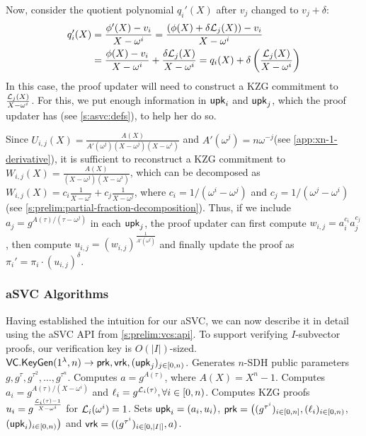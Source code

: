Now, consider the quotient polynomial $q_i'(X)$ after $v_j$ changed to $v_j+\delta$:
{\ifCameraReady\small\fi
\begin{align}
q_i'(X) &= \frac{\phi'(X)-v_i}{X-\omega^i}=\frac{\left(\phi(X) + \delta\mathcal{L}_j(X)\right) - v_i}{X-\omega^i}\\
        &= \frac{\phi(X) - v_i}{X-\omega^i}+\frac{\delta\mathcal{L}_j(X)}{X-\omega^i} = q_i(X) + \delta\left(\frac{\mathcal{L}_j(X)}{X-\omega^i}\right)
\end{align}
}%
In this case, the proof updater will need to construct a KZG commitment to $\frac{\mathcal{L}_j(X)}{X-\omega^i}$.
For this, we put enough information in $\mathsf{upk}_i$ and $\mathsf{upk}_j$, which the proof updater has (see \cref{s:asvc:defs}), to help her do so.

Since $U_{i,j}(X)=\frac{A(X)}{A'(\omega^j)(X-\omega^j)(X-\omega^i)}$ and $A'(\omega^j) = n\omega^{-j}$\ifNotCameraReady\xspace(see \cref{app:xn-1-derivative})\fi, it is sufficient to reconstruct a KZG commitment to $W_{i,j}(X)=\frac{A(X)}{(X-\omega^j)(X-\omega^i)}$, which can be decomposed as $W_{i,j}(X)= c_i \frac{1}{X-\omega^i} + c_j \frac{1}{X-\omega^j}$, where $c_i = 1/(\omega^i-\omega^j)$ and $c_j=1/(\omega^j-\omega^i)$ (see \cref{s:prelim:partial-fraction-decomposition}).
Thus, if we include $a_j=g^{{A(\tau)}/(\tau-\omega^j)}$ in each $\mathsf{upk}_j$, the proof updater can first compute $w_{i,j} = a_i^{c_i} a_j^{c_j}$, then compute $u_{i,j}=\left(w_{i,j}\right)^{\frac{1}{A'(\omega^j)}}$ and finally update the proof as  $\pi_i' = \pi_i \cdot (u_{i,j})^\delta$.

\subsubsection{aSVC Algorithms}
\label{s:asvc:from-kzg:algorithms}
Having established the intuition for our aSVC, we can now describe it in detail using the aSVC API from \cref{s:prelim:vcs:api}.
\ifNotCameraReady
To support verifying $I$-subvector proofs, our verification key is $O(|I|)$-sized.
\fi
\\

\api $\mathsf{VC}.\mathsf{KeyGen}(1^\lambda, n) \rightarrow \mathsf{prk},\mathsf{vrk},(\mathsf{upk}_j)_{j\in[0,n)}$.
Generates $n$-SDH public parameters $g,g^\tau,g^{\tau^2},\dots,g^{\tau^n}$.
Computes $a=g^{A(\tau)}$, where $A(X)=X^n - 1$.
Computes $a_i=g^{A(\tau)/(X-\omega^i)}$ and $\ell_i = g^{\mathcal{L}_i(\tau)}, \forall i\in[0,n)$.
Computes KZG proofs $u_i=g^{\frac{\mathcal{L}_i(\tau)-1}{X-\omega^i}}$ for $\mathcal{L}_i(\omega^i) = 1$.
Sets
$\mathsf{upk}_i = (a_i, u_i)$,
$\mathsf{prk} = \bigl((g^{\tau^i})_{i\in[0,n]},(\ell_i)_{i\in[0,n)}$, $(\mathsf{upk}_i)_{i\in[0,n)}\bigr)$
and $\mathsf{vrk} = ((g^{\tau^i})_{i\in [0,|I|]},a)$.

